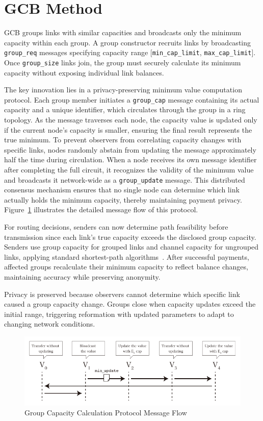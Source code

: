 \documentclass[conference]{IEEEtran}
\newcommand{\groupcap}{\texttt{group\_cap}}
\newcommand{\groupupdate}{\texttt{group\_update}}
\newcommand{\groupreq}{\texttt{group\_req}}
\newcommand{\groupsize}{\texttt{group\_size}}
\newcommand{\mincaplimit}{\texttt{min\_cap\_limit}}
\newcommand{\maxcaplimit}{\texttt{max\_cap\_limit}}
\begin{document}
\section{GCB Method}

GCB groups links with similar capacities and broadcasts only the minimum capacity within each group.
A group constructor recruits links by broadcasting \groupreq{} messages specifying capacity range [\mincaplimit{}, \maxcaplimit{}].
Once \groupsize{} links join, the group must securely calculate its minimum capacity without exposing individual link balances.

The key innovation lies in a privacy-preserving minimum value computation protocol.
Each group member initiates a \groupcap{} message containing its actual capacity and a unique identifier, which circulates through the group in a ring topology.
As the message traverses each node, the capacity value is updated only if the current node's capacity is smaller, ensuring the final result represents the true minimum.
To prevent observers from correlating capacity changes with specific links, nodes randomly abstain from updating the message approximately half the time during circulation.
When a node receives its own message identifier after completing the full circuit, it recognizes the validity of the minimum value and broadcasts it network-wide as a \groupupdate{} message.
This distributed consensus mechanism ensures that no single node can determine which link actually holds the minimum capacity, thereby maintaining payment privacy.
Figure~\ref{fig:group_cap_handover} illustrates the detailed message flow of this protocol.

For routing decisions, senders can now determine path feasibility before transmission since each link's true capacity exceeds the disclosed group capacity.
Senders use group capacity for grouped links and channel capacity for ungrouped links, applying standard shortest-path algorithms~\cite{lnd,eclair,clightning}.
After successful payments, affected groups recalculate their minimum capacity to reflect balance changes, maintaining accuracy while preserving anonymity.

Privacy is preserved because observers cannot determine which specific link caused a group capacity change.
Groups close when capacity updates exceed the initial range, triggering reformation with updated parameters to adapt to changing network conditions.

\begin{figure}[htbp]
	\centerline{\includegraphics[width=\linewidth]{fig/group_cap_handover}}
	\caption{Group Capacity Calculation Protocol Message Flow}
	\label{fig:group_cap_handover}
\end{figure}
\end{document}
